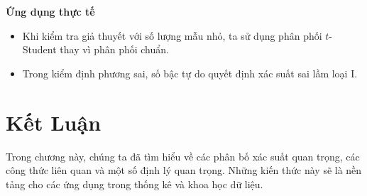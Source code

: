 \textbf{Ứng dụng thực tế}
\begin{itemize}
    \item Khi kiểm tra giả thuyết với số lượng mẫu nhỏ, ta sử dụng phân phối $t$-Student thay vì phân phối chuẩn.
    \item Trong kiểm định phương sai, số bậc tự do quyết định xác suất sai lầm loại I.
\end{itemize}


\section{Kết Luận}
Trong chương này, chúng ta đã tìm hiểu về các phân bố xác suất quan trọng, các công thức liên quan và một số định lý quan trọng. Những kiến thức này sẽ là nền tảng cho các ứng dụng trong thống kê và khoa học dữ liệu.


